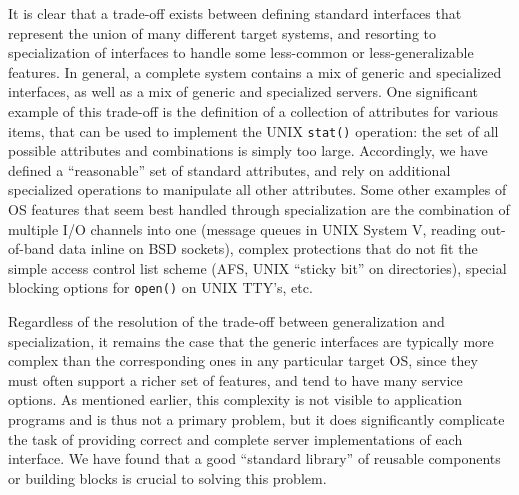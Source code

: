 It is clear that a trade-off exists between defining standard
interfaces that represent the union of many different target systems,
and resorting to specialization of interfaces to handle some
less-common or less-generalizable features.  In general, a complete
system contains a mix of generic and specialized interfaces, as well
as a mix of generic and specialized servers. One significant example
of this trade-off is the definition of a collection of attributes for
various items, that can be used to implement the UNIX {\tt stat()}
operation: the set of all possible attributes and combinations is
simply too large. Accordingly, we have defined a ``reasonable'' set of
standard attributes, and rely on additional specialized operations to
manipulate all other attributes.
{} Some other
examples of OS features that seem best handled through specialization
are the combination of multiple I/O channels into one (message queues
in UNIX System V, reading out-of-band data inline on BSD sockets),
complex protections that do not fit the simple access control list
scheme (AFS, UNIX ``sticky bit'' on directories), special blocking
options for {\tt open()} on UNIX TTY's, etc.



Regardless of the resolution of the trade-off between generalization
and specialization, it remains the case that the generic interfaces
are typically more complex than the corresponding ones in any
particular target OS, since they must often support a richer set of
features, and tend to have many service options. As mentioned earlier,
this complexity is not visible to application programs and is thus not
a primary problem, but it does significantly complicate the task of
providing correct and complete server implementations of each
interface. We have found that a good ``standard library'' of reusable
components or building blocks is crucial to solving this problem.

